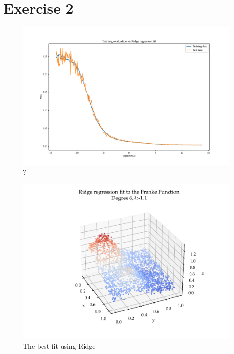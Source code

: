\documentclass[11pt]{article}
\begin{document}
\section*{Exercise 2}
\begin{figure}
  \centering
  \includegraphics[scale=0.55]{figures/Franke Function Ridge fit evaluation.pdf}
  \caption{?}
  \label{fig: ?}
\end{figure}

\begin{figure}
  \centering
  \includegraphics{figures/franke_function_Ridge_fit.pdf}
  \caption{The best fit using Ridge}
  \label{fig: Ridge_best_fit}
\end{figure}

\begin{center}
  \label{data: Ridge_best_fit}
\end{center}



\newpage
\newpage







\printbibliography
\end{document}
